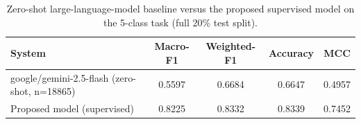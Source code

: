 \begin{table}[!htbp]
\centering
\caption{Zero-shot large-language-model baseline versus the proposed supervised model on the 5-class task (full 20\% test split).}
\label{tab:llm}
\small
\begin{tabular}{@{}lcccc@{}}
\toprule
\textbf{System} & \textbf{Macro-F1} & \textbf{Weighted-F1} & \textbf{Accuracy} & \textbf{MCC} \\
\midrule
google/gemini-2.5-flash (zero-shot, n=18865) & 0.5597 & 0.6684 & 0.6647 & 0.4957 \\
Proposed model (supervised) & 0.8225 & 0.8332 & 0.8339 & 0.7452 \\
\bottomrule
\end{tabular}
\end{table}